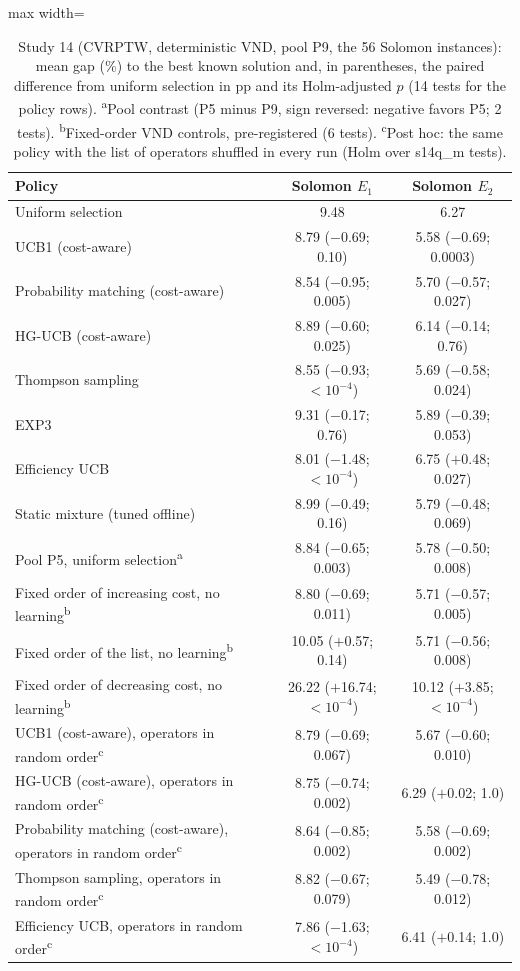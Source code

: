 \begin{table}[t]
\caption{Study 14 (CVRPTW, deterministic VND, pool P9, the 56 Solomon instances): mean gap (\%) to the best known solution and, in parentheses, the paired difference from uniform selection in pp and its Holm-adjusted $p$ (14 tests for the policy rows). \textsuperscript{a}Pool contrast (P5 minus P9, sign reversed: negative favors P5; 2 tests). \textsuperscript{b}Fixed-order VND controls, pre-registered (6 tests). \textsuperscript{c}Post hoc: the same policy with the list of operators shuffled in every run (Holm over \num{s14q_m} tests).}\label{tab:s14}
\centering
\small
\begin{adjustbox}{max width=\linewidth}
\begin{tabular}{lcc}
\toprule
Policy & Solomon $E_1$ & Solomon $E_2$ \\
\midrule
Uniform selection & 9.48 & 6.27 \\
UCB1 (cost-aware) & 8.79 ($-$0.69; 0.10) & 5.58 ($-$0.69; 0.0003) \\
Probability matching (cost-aware) & 8.54 ($-$0.95; 0.005) & 5.70 ($-$0.57; 0.027) \\
HG-UCB (cost-aware) & 8.89 ($-$0.60; 0.025) & 6.14 ($-$0.14; 0.76) \\
Thompson sampling & 8.55 ($-$0.93; \ensuremath{<10^{-4}}) & 5.69 ($-$0.58; 0.024) \\
EXP3 & 9.31 ($-$0.17; 0.76) & 5.89 ($-$0.39; 0.053) \\
Efficiency UCB & 8.01 ($-$1.48; \ensuremath{<10^{-4}}) & 6.75 ($+$0.48; 0.027) \\
Static mixture (tuned offline) & 8.99 ($-$0.49; 0.16) & 5.79 ($-$0.48; 0.069) \\
\addlinespace
Pool P5, uniform selection\textsuperscript{a} & 8.84 ($-$0.65; 0.003) & 5.78 ($-$0.50; 0.008) \\
Fixed order of increasing cost, no learning\textsuperscript{b} & 8.80 ($-$0.69; 0.011) & 5.71 ($-$0.57; 0.005) \\
Fixed order of the list, no learning\textsuperscript{b} & 10.05 ($+$0.57; 0.14) & 5.71 ($-$0.56; 0.008) \\
Fixed order of decreasing cost, no learning\textsuperscript{b} & 26.22 ($+$16.74; \ensuremath{<10^{-4}}) & 10.12 ($+$3.85; \ensuremath{<10^{-4}}) \\
UCB1 (cost-aware), operators in random order\textsuperscript{c} & 8.79 ($-$0.69; 0.067) & 5.67 ($-$0.60; 0.010) \\
HG-UCB (cost-aware), operators in random order\textsuperscript{c} & 8.75 ($-$0.74; 0.002) & 6.29 ($+$0.02; 1.0) \\
Probability matching (cost-aware), operators in random order\textsuperscript{c} & 8.64 ($-$0.85; 0.002) & 5.58 ($-$0.69; 0.002) \\
Thompson sampling, operators in random order\textsuperscript{c} & 8.82 ($-$0.67; 0.079) & 5.49 ($-$0.78; 0.012) \\
Efficiency UCB, operators in random order\textsuperscript{c} & 7.86 ($-$1.63; \ensuremath{<10^{-4}}) & 6.41 ($+$0.14; 1.0) \\
\bottomrule
\end{tabular}
\end{adjustbox}
\end{table}
